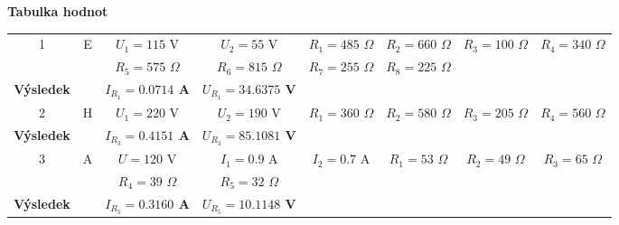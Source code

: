 \documentclass[10pt,a4paper]{article}
\begin{document}
  \begin{center}
   \begin{large}
   \textbf{{\LARGE Tabulka hodnot}}
    
    \begin{table}[ht]
     \centering
      \begin{tabular}{|c|c|c|c|c|c|c|c|}
       \hline
\multirow{2}{*}{1} & \multirow{2}{*}{E} & $U_1= 115$ V & $U_2=55$ V & $R_1=485$ $\Omega$ & $R_2=660$ $\Omega $ & $R_3=100$ $\Omega$ & $R_4=340$ $\Omega $ \\ \cline{3-8} 
 &  & $R_5=575$ $\Omega$& $R_6=815$ $\Omega$ & $R_7=255$ $\Omega$ & $R_8=225$ $\Omega$ & \multicolumn{2}{c|}{} \\ \hline
\textbf{Výsledek} & \textbf{} & \textbf{$I_{R_1}=0.0714$ A} & \textbf{$U_{R_1}=34.6375$ V} & \multicolumn{4}{c|}{} \\ \hline
2 & H & $U_1=220$ V & $U_2=190$ V & $R_1=360$ $\Omega$ & $R_2=580$ $\Omega$ & $R_3=205$ $\Omega$ & $R_4=560$ $\Omega$ \\ \hline
\textbf{Výsledek} & \textbf{} & \textbf{$I_{R_3}=0.4151$ A} & \textbf{$U_{R_3}=85.1081$ V} & \multicolumn{4}{c|}{} \\ \hline
\multirow{2}{*}{3} & \multirow{2}{*}{A} & $U=120$ V & $I_1=0.9$ A & $I_2=0.7$ A & $R_1=53$ $\Omega$ & $R_2=49$ $\Omega$ & $R_3=65$ $\Omega$ \\ \cline{3-8} 
 &  & $R_4=39$ $\Omega$ & $R_5=32$ $\Omega$ & \multicolumn{4}{c|}{} \\ \hline
\textbf{Výsledek} & \textbf{} & \textbf{$I_{R_5}=0.3160$ A} & \textbf{$U_{R_5}=10.1148$ V} & \multicolumn{4}{c|}{} \\ \hline
\end{tabular}
\end{table}
   \end{large}
  \end{center}      
  
\end{document}
